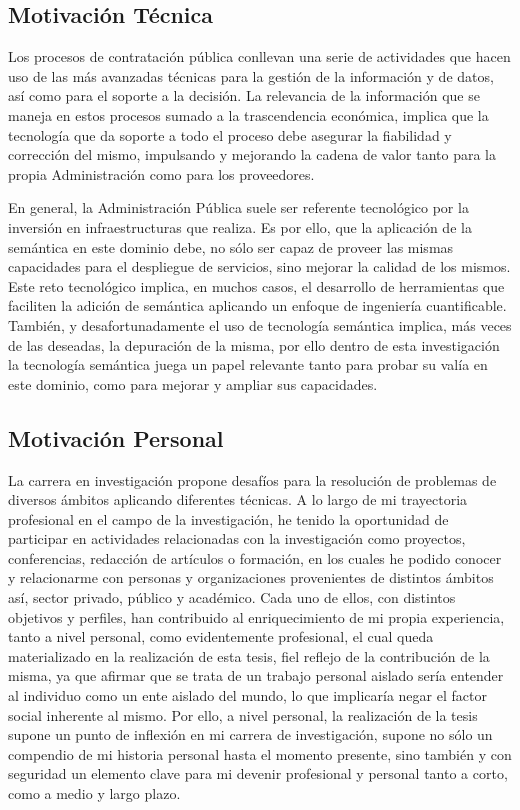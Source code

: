 \subsection{Motivación Técnica}
Los procesos de contratación pública conllevan una serie de actividades que hacen uso
de las más avanzadas técnicas para la gestión de la información y de datos, así como para
el soporte a la decisión. La relevancia de la información que se maneja
en estos procesos sumado a la trascendencia económica, implica que la tecnología que da
soporte a todo el proceso debe asegurar la fiabilidad y corrección del mismo, impulsando
y mejorando la cadena de valor tanto para la propia Administración como para los proveedores.

En general, la Administración Pública suele ser referente tecnológico por la inversión
en infraestructuras que realiza. Es por ello, que la aplicación de la semántica
en este dominio debe, no sólo ser capaz de proveer las mismas capacidades para el 
despliegue de servicios, sino mejorar la calidad de los mismos. Este reto
tecnológico implica, en muchos casos, el desarrollo de herramientas que faciliten
la adición de semántica aplicando un enfoque de ingeniería cuantificable. También, y
desafortunadamente el uso de tecnología semántica implica, más veces de las deseadas, 
la depuración de la misma, por ello dentro de esta investigación la tecnología semántica juega un papel
relevante tanto para probar su valía en este dominio, como para mejorar y ampliar sus capacidades.

\subsection{Motivación Personal}
La carrera en investigación propone desafíos para la resolución de problemas
de diversos ámbitos aplicando diferentes técnicas. A lo largo de mi trayectoria profesional
en el campo de la investigación, he tenido la oportunidad de participar
en actividades relacionadas con la investigación como proyectos, conferencias, redacción
de artículos o formación, en los cuales he podido conocer y relacionarme con personas
y organizaciones provenientes de distintos ámbitos así, sector privado, público y académico. Cada uno 
de ellos, con distintos objetivos y perfiles, han contribuido al enriquecimiento de mi propia experiencia, tanto
a nivel personal, como evidentemente profesional, el cual queda materializado en la realización
de esta tesis, fiel reflejo de la contribución de la misma, ya que afirmar que se trata de un trabajo personal aislado sería
entender al individuo como un ente aislado del mundo, lo que implicaría negar el factor
social inherente al mismo. Por ello, a nivel personal, la realización de la tesis supone
un punto de inflexión en mi carrera de investigación, supone no sólo un compendio de mi historia
personal hasta el momento presente, sino también y con seguridad un elemento clave para mi devenir profesional y personal
tanto a corto, como a medio y largo plazo. 

